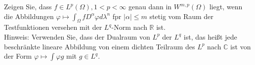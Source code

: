 Zeigen Sie, dass $f \in L^p(\Omega), 1 < p < \infty$ genau dann in $W^{m,p}(\Omega)$ liegt, wenn die Abbildungen
$\varphi \mapsto \int_{\Omega}fD^{\alpha}\varphi d\lambda^n$ fpr $|\alpha| \leq m$ stetig vom Raum der Testfunktionen versehen mit der $L^q$-Norm nach $\mathbb{R}$ ist.\\
Hinweis: Verwenden Sie, dass der Dualraum von $L^p$ der $L^q$ ist, das heißt jede beschränkte lineare Abbildung von einem dichten Teilraum
des $L^p$ nach $\mathbb{C}$ ist von der Form $\varphi \mapsto \int \varphi g$ mit $g \in L^q$.